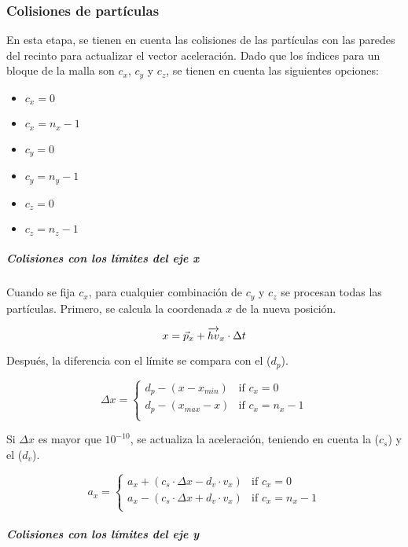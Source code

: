 \subsubsection{Colisiones de partículas}

En esta etapa, se tienen en cuenta las colisiones de las partículas con las
paredes del recinto para actualizar el vector aceleración.
Dado que los índices para un bloque de la malla son
$c_x$, $c_y$ y $c_z$, se tienen en cuenta las siguientes opciones:

\begin{itemize}
\item $c_x=0$
\item $c_x=n_x-1$
\item $c_y=0$
\item $c_y=n_y-1$
\item $c_z=0$
\item $c_z=n_z-1$
\end{itemize}

\subparagraph{Colisiones con los límites del eje x}

Cuando se fija $c_x$, para cualquier combinación de $c_y$ y $c_z$ se
procesan todas las partículas. Primero, se calcula la coordenada $x$ de la 
nueva posición.

\[
x = \vec{p}_x + \overrightarrow{hv}_x \cdot \Delta t \\
\]

Después, la diferencia con el límite se compara con el  ($d_p$).

\[
\Delta x = 
\begin{cases}
d_p - (x - x_{min}) & \text{if } c_x = 0\\
d_p - (x_{max} - x) & \text{if } c_x = n_x -1\\
\end{cases}
\]

Si $\Delta x$ es mayor que $10^{-10}$, se actualiza la aceleración,
teniendo en cuenta la  ($c_s$) y el
 ($d_v$).

\[
a_x = 
\begin{cases}
  a_x + ( c_s \cdot \Delta x - d_v \cdot v_x )  & \text{if  } c_x = 0\\
  a_x - ( c_s \cdot \Delta x + d_v \cdot v_x ) & \text{if  } c_x = n_x-1\\
\end{cases}
\]

\subparagraph{Colisiones con los límites del eje y}


